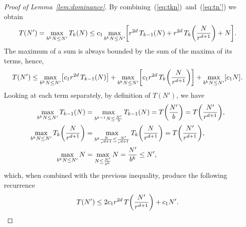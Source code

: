 \begin{proof}[Proof of Lemma~\ref{lem:dominance}]
By combining~(\ref{eq:tkn})~and~(\ref{eq:tn'}) we obtain
\begin{displaymath}
	T(N')
	=
	\max_{b^k N\le N'} T_k(N)
	\le
	c_1
	\max_{b^k N\le N'} \mleft[
	r^{2d} \,T_{k-1}\mleft(N\mright)
	+ r^{2d} \,T_k\mleft(\frac{N}{r^{d+1}}\mright)
	+ N\mright].
\end{displaymath}
The maximum of a sum is always bounded by the sum of the maxima of its terms,
hence,
\begin{displaymath}
	T(N')
	\le
	\max_{b^k N\le N'} \mleft[ c_1 r^{2d} \,T_{k-1} \mleft(N\mright)\mright]
	+
	\max_{b^k N\le N'} \mleft[ c_1 r^{2d} \,T_k \mleft(\frac{N}{r^{d+1}}\mright)\mright]
	+
	\max_{b^k N\le N'} \mleft[ c_1 N \mright].
\end{displaymath}
Looking at each term separately, by definition of $T(N')$, we have
\begin{align*}
\max_{b^k N\le N'} T_{k-1}(N)
&=
\max_{b^{k-1} N\le \frac{N'}{b}} T_{k-1}(N)
=
T\mleft(\frac{N'}{b}\mright)
=
T\mleft(\frac{N'}{r^{d+1}}\mright),\\
%
\max_{b^k N\le N'}  T_{k}\mleft(\frac{N}{r^{d+1}}\mright)
&=
\max_{b^k \frac{N}{r^{d+1}} \le \frac{N'}{r^{d + 1}}} T_{k}\mleft(\frac{N}{r^{d+1}} \mright)
=
T\mleft(\frac{N'}{r^{d+1}}\mright),\\
%
\max_{b^k N\le N'} N
&=
\max_{N\le \frac{N'}{b^k}} N
=
\frac{N'}{b^k} \le N',
\end{align*}
which, when combined with the previous inequality, produce the following recurrence
\begin{displaymath}
	T(N') \le 2 c_1 r^{2d} \,T\mleft(\frac{N'}{r^{d+1}}\mright) + c_1 N'.
\end{displaymath}


\end{proof}
